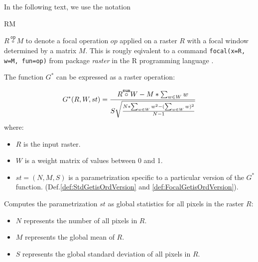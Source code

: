 \documentclass{itatnew}
\newcommand{\FOCALMMODE}[3]{
  #1{\stackrel{\mathtt{#3}}{\circ}}#2
}
\newcommand{\FOCAL}[3]{
  \ifmmode
  \FOCALMMODE{#1}{#2}{#3}
  \else
  \begin{math}\FOCALMMODE{#1}{#2}{#3}\end{math}%
  \fi
}
\begin{document}
In the following text, we use the notation \FOCAL{R}{M}{op} to denote
a focal operation $op$ applied on a raster $R$ with a focal window determined 
by a
matrix $M$. This is rougly eqivalent to a command \verb|focal(x=R, w=M, fun=op)|
from package \emph{raster} in the R programming language \cite{cran:raster}.

\begin{definition}
  \label{def:GenericGetisOrdFunc}
  
  The function $G^*$ can be expressed as a raster operation:
  
  \begin{displaymath}
  G^*(R, W, st) =
  \frac{
    \FOCAL{R}{W}{sum} - M*\sum_{w \in W}{w}
  }{
  S \sqrt{
    \frac{
      N*\sum_{w \in W}{w^2} - (\sum_{w \in W}{w})^2
    }{
    N - 1
  }
}
}
\end{displaymath}
\noindent where:
\begin{itemize}
  
  \item $R$ is the input raster.
  
  \item $W$ is a weight matrix of values between 0 and 1.
  
  \item $st = (N, M, S)$ is a parametrization specific to a particular version
  of the $G^*$ function. (Def.\vref{def:StdGetisOrdVersion} and
  \vref{def:FocalGetisOrdVersion}).
  
\end{itemize}
\end{definition}

\begin{definition}
  \label{def:StdGetisOrdVersion}
  
  Computes the parametrization $st$ as global statistics for all pixels in the
  raster $R$:
  
  \begin{itemize}
    \item $N$ represents the number of all pixels in $R$.
    \item $M$ represents the global mean of $R$.
    \item $S$ represents the global standard deviation of all pixels in $R$.
  \end{itemize}
\end{definition}
\end{document}
